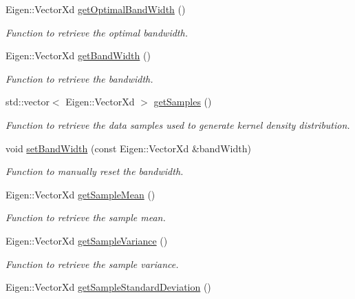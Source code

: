 \begin{DoxyCompactItemize}
Eigen\+::\+Vector\+Xd \hyperlink{classtudat_1_1statistics_1_1KernelDensityDistribution_ae4f8ad854752925254940a989399f141}{get\+Optimal\+Band\+Width} ()
\begin{DoxyCompactList}\small\item\em Function to retrieve the optimal bandwidth. \end{DoxyCompactList}\item 
Eigen\+::\+Vector\+Xd \hyperlink{classtudat_1_1statistics_1_1KernelDensityDistribution_afc9e72b066ced6e06347a569df69c556}{get\+Band\+Width} ()
\begin{DoxyCompactList}\small\item\em Function to retrieve the bandwidth. \end{DoxyCompactList}\item 
std\+::vector$<$ Eigen\+::\+Vector\+Xd $>$ \hyperlink{classtudat_1_1statistics_1_1KernelDensityDistribution_a085c6ea1a52e4e2ce859d0a6865c8793}{get\+Samples} ()
\begin{DoxyCompactList}\small\item\em Function to retrieve the data samples used to generate kernel density distribution. \end{DoxyCompactList}\item 
void \hyperlink{classtudat_1_1statistics_1_1KernelDensityDistribution_ab80de71e5a2bc8ed07d5dcaf468fd834}{set\+Band\+Width} (const Eigen\+::\+Vector\+Xd \&band\+Width)
\begin{DoxyCompactList}\small\item\em Function to manually reset the bandwidth. \end{DoxyCompactList}\item 
Eigen\+::\+Vector\+Xd \hyperlink{classtudat_1_1statistics_1_1KernelDensityDistribution_a3ce8d6572385efa10c80d70d898aade5}{get\+Sample\+Mean} ()
\begin{DoxyCompactList}\small\item\em Function to retrieve the sample mean. \end{DoxyCompactList}\item 
Eigen\+::\+Vector\+Xd \hyperlink{classtudat_1_1statistics_1_1KernelDensityDistribution_abc1c800ffc9b8365dd47ff1927cbec11}{get\+Sample\+Variance} ()
\begin{DoxyCompactList}\small\item\em Function to retrieve the sample variance. \end{DoxyCompactList}\item 
Eigen\+::\+Vector\+Xd \hyperlink{classtudat_1_1statistics_1_1KernelDensityDistribution_a234e3d235dafb5f52caca40249ffc2fd}{get\+Sample\+Standard\+Deviation} ()

\end{DoxyCompactItemize}
